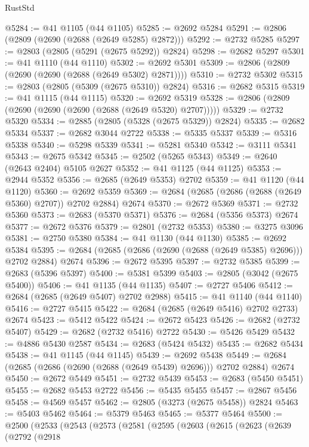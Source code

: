 \begin{lexlean}{RustStd}
\begin{coremodule}
@5284 := @41 @1105 (@44 @1105)
@5285 := @2692 @5284
@5291 := @2806 (@2809 (@2690 (@2688 (@2649 @5285) @2872)))
@5292 := @2732 @5285
@5297 := @2803 (@2805 (@5291 (@2675 @5292)) @2824)
@5298 := @2682 @5297
@5301 := @41 @1110 (@44 @1110)
@5302 := @2692 @5301
@5309 := @2806 (@2809 (@2690 (@2690 (@2688 (@2649 @5302) @2871))))
@5310 := @2732 @5302
@5315 := @2803 (@2805 (@5309 (@2675 @5310)) @2824)
@5316 := @2682 @5315
@5319 := @41 @1115 (@44 @1115)
@5320 := @2692 @5319
@5328 := @2806 (@2809 (@2690 (@2690 (@2690 (@2688 (@2649 @5320) @2707)))))
@5329 := @2732 @5320
@5334 := @2885 (@2805 (@5328 (@2675 @5329)) @2824)
@5335 := @2682 @5334
@5337 := @2682 @3044 @2722
@5338 := @5335 @5337
@5339 := @5316 @5338
@5340 := @5298 @5339
@5341 := @5281 @5340
@5342 := @3111 @5341
@5343 := @2675 @5342
@5345 := @2502 (@5265 @5343)
@5349 := @2640 (@2643 @2404) @5105 @2627
@5352 := @41 @1125 (@44 @1125)
@5353 := @2944 @5352
@5356 := @2685 (@2649 @5353) @2702
@5359 := @41 @1120 (@44 @1120)
@5360 := @2692 @5359
@5369 := @2684 (@2685 (@2686 (@2688 (@2649 @5360) @2707)) @2702 @2884) @2674
@5370 := @2672 @5369
@5371 := @2732 @5360
@5373 := @2683 (@5370 @5371)
@5376 := @2684 (@5356 @5373) @2674
@5377 := @2672 @5376
@5379 := @2801 (@2732 @5353)
@5380 := @3275 @3096
@5381 := @2750 @5380
@5384 := @41 @1130 (@44 @1130)
@5385 := @2692 @5384
@5395 := @2684 (@2685 (@2686 (@2690 (@2688 (@2649 @5385) @2696))) @2702 @2884) @2674
@5396 := @2672 @5395
@5397 := @2732 @5385
@5399 := @2683 (@5396 @5397)
@5400 := @5381 @5399
@5403 := @2805 (@3042 (@2675 @5400))
@5406 := @41 @1135 (@44 @1135)
@5407 := @2727 @5406
@5412 := @2684 (@2685 (@2649 @5407) @2702 @2988)
@5415 := @41 @1140 (@44 @1140)
@5416 := @2727 @5415
@5422 := @2684 (@2685 (@2649 @5416) @2702 @2733) @2674
@5423 := @5412 @5422
@5424 := @2672 @5423
@5426 := @2682 (@2732 @5407)
@5429 := @2682 (@2732 @5416) @2722
@5430 := @5426 @5429
@5432 := @4886 @5430 @2587
@5434 := @2683 (@5424 @5432)
@5435 := @2682 @5434
@5438 := @41 @1145 (@44 @1145)
@5439 := @2692 @5438
@5449 := @2684 (@2685 (@2686 (@2690 (@2688 (@2649 @5439) @2696))) @2702 @2884) @2674
@5450 := @2672 @5449
@5451 := @2732 @5439
@5453 := @2683 (@5450 @5451)
@5455 := @2682 @5453 @2722
@5456 := @5435 @5455
@5457 := @2867 @5456
@5458 := @4569 @5457
@5462 := @2805 (@3273 (@2675 @5458)) @2824
@5463 := @5403 @5462
@5464 := @5379 @5463
@5465 := @5377 @5464
@5500 := @2500
    (@2533
      (@2543
        (@2573
          (@2581
            (@2595
              (@2603
                (@2615
                  (@2623
                    (@2639
                      (@2792
                        (@2918

\end{coremodule}
\end{lexlean}
